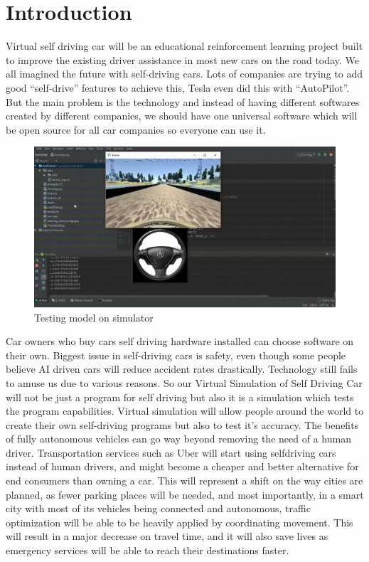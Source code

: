 \documentclass[11pt]{article}
\date{\today}
\title{}
\begin{document}
\tableofcontents

\section{Introduction}
\label{sec:orgd8eca56}
Virtual self driving car will be an educational reinforcement learning project built to
improve the existing driver assistance in most new cars on the road today. We all imagined
the future with self-driving cars. Lots of companies are trying to add good “self-drive”
features to achieve this, Tesla even did this with “AutoPilot”. But the main problem is
the technology and instead of having different softwares created by different companies,
we should have one universal software which will be open source for all car companies so
everyone can use it.
\begin{figure}[htbp]
\centering
\includegraphics[width=.9\linewidth]{./img/project-running.png}
\caption{\label{fig:org58af00a}Testing model on simulator}
\end{figure}
Car owners who buy cars self driving hardware installed can choose software on their own.
Biggest issue in self-driving cars is safety, even though some people believe AI driven cars
will reduce accident rates drastically. Technology still fails to amuse us due to various
reasons. So our Virtual Simulation of Self Driving Car will not be just a program for self
driving but also it is a simulation which tests the program capabilities. Virtual simulation
will allow people around the world to create their own self-driving programs but also to test
it’s accuracy.
The benefits of fully autonomous vehicles can go way beyond removing the
need of a human driver. Transportation services such as Uber will start using selfdriving
cars instead of human drivers, and might become a cheaper and better
alternative for end consumers than owning a car. This will represent a shift on the
way cities are planned, as fewer parking places will be needed, and most importantly,
in a smart city with most of its vehicles being connected and autonomous,
traffic optimization will be able to be heavily applied by coordinating movement.
This will result in a major decrease on travel time, and it will also save lives as
emergency services will be able to reach their destinations faster.
\clearpage
\end{document}
